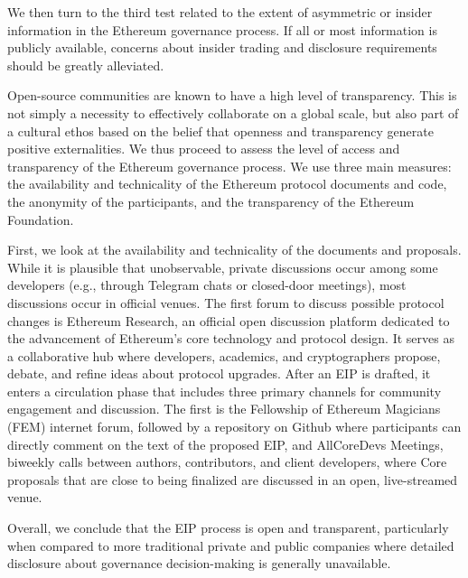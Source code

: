 \documentclass[No]{AEA}
\begin{document}
We then turn to the third test related to the extent of asymmetric or insider information in the Ethereum governance process. If all or most information is publicly available, concerns about insider trading and disclosure requirements should be greatly alleviated.   

Open-source communities are known to have a high level of transparency. This is not simply a necessity to effectively collaborate on a global scale, but also part of a cultural ethos based on the belief that openness and transparency generate positive externalities. We thus proceed to assess the level of access and transparency of the Ethereum governance process. We use three main measures: the availability and technicality of the Ethereum protocol documents and code, the anonymity of the participants, and the transparency of the Ethereum Foundation. 

First, we look at the availability and technicality of the documents and proposals. While it is plausible that unobservable, private discussions occur among some developers (e.g., through Telegram chats or closed-door meetings), most discussions occur in official venues. The first forum to discuss possible protocol changes is Ethereum Research, an official open discussion platform dedicated to the advancement of Ethereum's core technology and protocol design. It serves as a collaborative hub where developers, academics, and cryptographers propose, debate, and refine ideas about protocol upgrades. After an EIP is drafted, it enters a circulation phase that includes three primary channels for community engagement and discussion. The first is the Fellowship of Ethereum Magicians (FEM) internet forum, followed by a repository on Github where participants can directly comment on the text of the proposed EIP, and AllCoreDevs Meetings, biweekly calls between authors, contributors, and client developers, where Core proposals that are close to being finalized are discussed in an open, live-streamed venue.

Overall, we conclude that the EIP process is open and transparent, particularly when compared to more traditional private and public companies where detailed disclosure about governance decision-making is generally unavailable.
\end{document}
